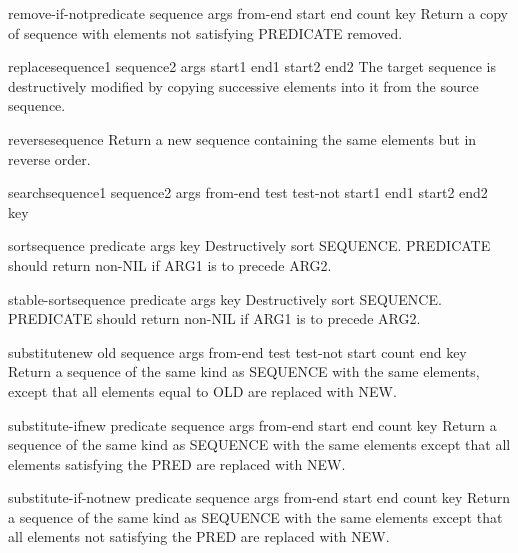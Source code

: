 \begin{function}{remove-if-not}{predicate sequence \rest args \key from-end start end count key}
  Return a copy of sequence with elements not satisfying PREDICATE removed.
\end{function}

\begin{function}{replace}{sequence1 sequence2 \rest args \key start1 end1 start2 end2}
  The target sequence is destructively modified by copying successive
   elements into it from the source sequence.
\end{function}

\begin{function}{reverse}{sequence}
  Return a new sequence containing the same elements but in reverse order.
\end{function}

\begin{function}{search}{sequence1 sequence2 \rest args \key from-end test test-not start1 end1 start2
 end2 key}
  
\end{function}

\begin{function}{sort}{sequence predicate \rest args \key key}
  Destructively sort SEQUENCE. PREDICATE should return non-NIL if
   ARG1 is to precede ARG2.
\end{function}

\begin{function}{stable-sort}{sequence predicate \rest args \key key}
  Destructively sort SEQUENCE. PREDICATE should return non-NIL if
   ARG1 is to precede ARG2.
\end{function}

\begin{function}{substitute}{new old sequence \rest args \key from-end test test-not start count end key}
  Return a sequence of the same kind as SEQUENCE with the same elements,
  except that all elements equal to OLD are replaced with NEW.
\end{function}

\begin{function}{substitute-if}{new predicate sequence \rest args \key from-end start end count key}
  Return a sequence of the same kind as SEQUENCE with the same elements
  except that all elements satisfying the PRED are replaced with NEW.
\end{function}

\begin{function}{substitute-if-not}{new predicate sequence \rest args \key from-end start end count key}
  Return a sequence of the same kind as SEQUENCE with the same elements
  except that all elements not satisfying the PRED are replaced with NEW.
\end{function}

